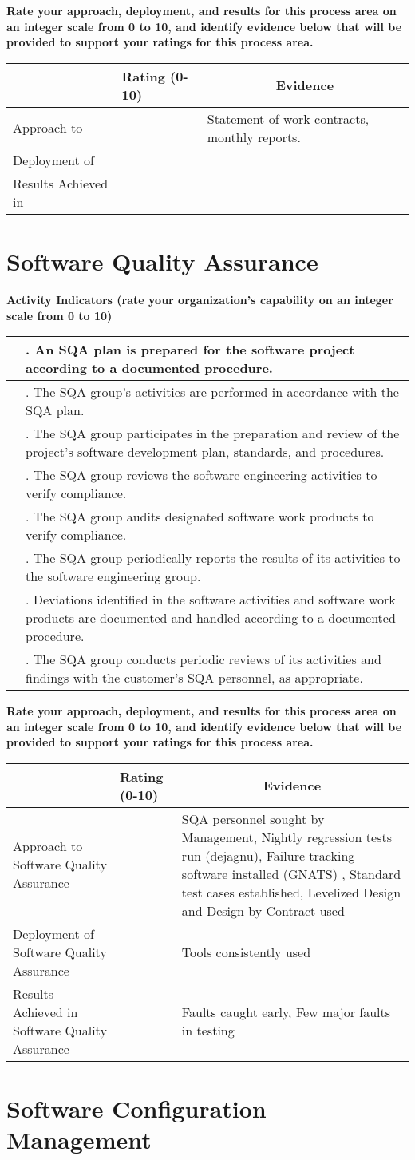 \documentclass{article}
\newcommand{\KPAname}{}
\let\KPAsection=\section
\renewcommand{\section}[1]{\renewcommand{\KPAname}{#1}\KPAsection{#1}}
\newcounter{activity}[section]		%
\newcounter{approach}[section]
\newcounter{deployment}[section]
\newcounter{result}[section]
\newcounter{score}
\newenvironment{KPAActivity}
{
    {\bf Activity Indicators (rate your organization's capability
    on an integer scale from 0 to 10)} %
    \begin{center}
    \begin{tabular}{|p{0.5in}|p{6.0in}|} \hline %
}
{
    \end{tabular}
    \end{center}
    \setcounter{approach}{\value{approach}/\value{activity}}
    \setcounter{deployment}{\value{deployment}/\value{activity}}
    \setcounter{result}{\value{result}/\value{activity}}
}
\newcommand{\Activity}[4]
{
    \stepcounter{activity} 
    \setcounter{score}{(#1+#2+#3)/3}
    \setcounter{approach}{\value{approach}+#1}
    \setcounter{deployment}{\value{deployment}+#1}
    \setcounter{result}{\value{result}+#1}
    \arabic{score} & \arabic{activity}. #4 \\ \hline
} %
\newenvironment{KPARate}
{
    {\bf Rate your approach, deployment, and results for
    this process area on an integer scale from 0 to 10, and 
    identify evidence below that will be provided to support your
    ratings for this process area.}
    \begin{center}
    \begin{tabular}{|p{1.0in}|p{0.5in}|p{5.0in}|} \hline
    & Rating (0-10) & \multicolumn{1}{c|}{Evidence} \\ \hline
}
{
    \end{tabular}
    \end{center}
}
\newcommand{\Approach}[1]
{
    Approach to \KPAname & \arabic{approach} & #1 \\ \hline
}
\newcommand{\Deployment}[1]
{
    Deployment of \KPAname & \arabic{deployment} & #1 \\ \hline
}
\newcommand{\Results}[1]
{
    Results Achieved in \KPAname & \arabic{result} & #1 \\ \hline
}
\begin{document}
\begin{KPARate}
\Approach{Statement of work contracts, monthly reports.}
\Deployment{}
\Results{}
\end{KPARate}

\newpage
\section{Software Quality Assurance}

\begin{KPAActivity}
\Activity{2}{2}{2}{An SQA plan is prepared for the software project
according to a documented procedure.}
\Activity{5}{5}{5}{The SQA group's activities are performed in accordance
with the SQA plan.}
\Activity{5}{5}{5}{The SQA group participates in the preparation and review
of the project's software development plan, standards, and
procedures.}
\Activity{4}{4}{4}{The SQA group reviews the software engineering activities
to verify compliance.}
\Activity{6}{6}{6}{The SQA group audits designated software work products to
verify compliance.}
\Activity{6}{6}{6}{The SQA group periodically reports the results of its
activities to the software engineering group.}
\Activity{4}{4}{4}{Deviations identified in the software activities and
software work products are documented and handled according to a
documented procedure.}
\Activity{2}{2}{2}{The SQA group conducts periodic reviews of its activities
and findings with the customer's SQA personnel, as appropriate.}
\end{KPAActivity}

\begin{KPARate}
\Approach{SQA personnel sought by Management, Nightly regression
             tests run (dejagnu), Failure tracking software installed
             (GNATS) , Standard test cases established, Levelized
             Design and Design by Contract used}
\Deployment{Tools consistently used}
\Results{Faults caught early, Few major faults in testing}
\end{KPARate}

\newpage
\section{Software Configuration Management}
\end{document}
